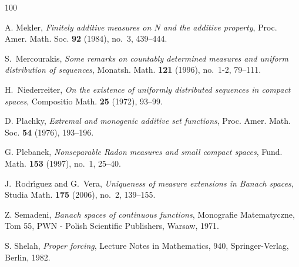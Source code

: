 \documentclass[12pt]{amsart}
\newcommand{\0}{\protect{\bf 0}}
\newcommand{\1}{\protect{\bf 1}}
\theoremstyle{definition}
\theoremstyle{remark}
\numberwithin{equation}{section}
\begin{document}
\begin{thebibliography}{100}


 A. Mekler, {\em Finitely additive measures on N and the additive property},  
Proc. Amer. Math. Soc. \textbf{92} (1984), no.~3, 439--444.

S.~Mercourakis, \emph{Some remarks on countably determined measures and uniform
  distribution of sequences}, Monatsh. Math. \textbf{121} (1996), no.~1-2, 79--111. 

H.~Niederreiter, \emph{On the existence of uniformly distributed sequences in
  compact spaces}, Compositio Math. \textbf{25} (1972), 93--99. 

D. Plachky, \emph{Extremal and monogenic additive set functions}, Proc. Amer. Math. Soc. \textbf{54} (1976), 193--196.

 G. Plebanek,
{\em Nonseparable Radon measures and small compact spaces}, 
Fund. Math. \textbf{153} (1997), no.~1, 25--40. 

J.~Rodr{\'{\i}}guez and G.~Vera, \emph{Uniqueness of measure extensions in
  {B}anach spaces}, Studia Math. \textbf{175} (2006), no.~2, 139--155.

Z. Semadeni, \emph{Banach spaces of continuous functions}, 
Monografie Matematyczne, Tom 55, PWN - Polish Scientific Publishers, Warsaw, 1971. 

 S. Shelah, {\em Proper forcing}, Lecture Notes in Mathematics, 940, Springer-Verlag, Berlin, 1982.


\end{thebibliography}
\end{document}
